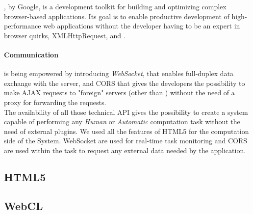 , by Google, is a development toolkit for building and optimizing
complex browser-based applications. Its goal is to enable productive development
of high-performance web applications without the developer having to be an expert
in browser quirks, XMLHttpRequest, and \js{}.\\



\paragraph{Communication} is being empowered by
introducing \emph{WebSocket}, that enables full-duplex data exchange with the
server, and \ac{CORS} that gives the developers the possibility to make \ac{AJAX}
requests to "foreign" servers (other than ) without the need of
a proxy for forwarding the requests.\\


The availability of all those technical API gives the possibility to create a
system capable of performing any \emph{Human} or \emph{Automatic} computation
task without the need of external plugins. We used all the features of HTML5
for the computation side of the System. WebSocket are used for real-time task
monitoring and \ac{CORS} are used within the task to request any
external data needed by the application.

\subsection{\acs{HTML}5}
\label{sec:bg:web:html5}



\subsection{WebCL}
\label{sec:bg:web:webcl}
